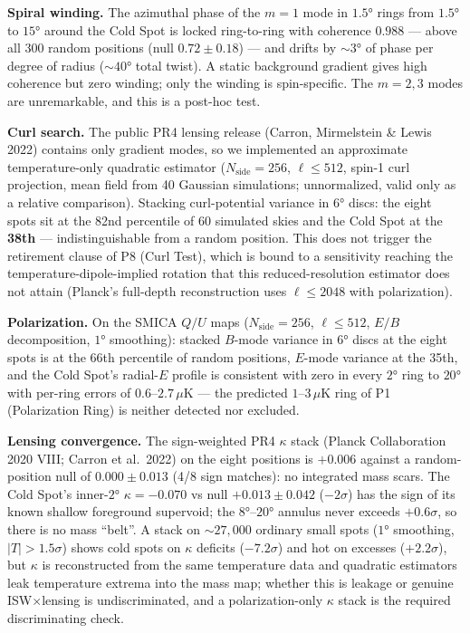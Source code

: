 \documentclass[
]{article}
\begin{document}
\textbf{Spiral winding.} The azimuthal phase of the \(m = 1\) mode in
\(1.5°\) rings from \(1.5°\) to \(15°\) around the Cold Spot is locked
ring-to-ring with coherence \(0.988\) --- above all 300 random positions
(null \(0.72 \pm 0.18\)) --- and drifts by \(\sim\!3°\) of phase per
degree of radius (\(\sim\!40°\) total twist). A static background
gradient gives high coherence but zero winding; only the winding is
spin-specific. The \(m = 2, 3\) modes are unremarkable, and this is a
post-hoc test.

\textbf{Curl search.} The public PR4 lensing release (Carron,
Mirmelstein \& Lewis 2022) contains only gradient modes, so we
implemented an approximate temperature-only quadratic estimator
(\(N_{\text{side}} = 256\), \(\ell \leq 512\), spin-1 curl projection,
mean field from 40 Gaussian simulations; unnormalized, valid only as a
relative comparison). Stacking curl-potential variance in \(6°\) discs:
the eight spots sit at the 82nd percentile of 60 simulated skies and the
Cold Spot at the \textbf{38th} --- indistinguishable from a random
position. This does not trigger the retirement clause of P8 (Curl Test),
which is bound to a sensitivity reaching the temperature-dipole-implied
rotation that this reduced-resolution estimator does not attain
(Planck's full-depth reconstruction uses \(\ell \leq 2048\) with
polarization).

\textbf{Polarization.} On the SMICA \(Q/U\) maps
(\(N_{\text{side}} = 256\), \(\ell \leq 512\), \(E/B\) decomposition,
\(1°\) smoothing): stacked \(B\)-mode variance in \(6°\) discs at the
eight spots is at the 66th percentile of random positions, \(E\)-mode
variance at the 35th, and the Cold Spot's radial-\(E\) profile is
consistent with zero in every \(2°\) ring to \(20°\) with per-ring
errors of \(0.6\)--\(2.7\,\mu\)K --- the predicted \(1\)--\(3\,\mu\)K
ring of P1 (Polarization Ring) is neither detected nor excluded.

\textbf{Lensing convergence.} The sign-weighted PR4 \(\kappa\) stack
(Planck Collaboration 2020 VIII; Carron et al.~2022) on the eight
positions is \(+0.006\) against a random-position null of
\(0.000 \pm 0.013\) (4/8 sign matches): no integrated mass scars. The
Cold Spot's inner-\(2°\) \(\kappa = -0.070\) vs null
\(+0.013 \pm 0.042\) (\(-2\sigma\)) has the sign of its known shallow
foreground supervoid; the \(8°\)--\(20°\) annulus never exceeds
\(+0.6\sigma\), so there is no mass ``belt''. A stack on
\(\sim\!27{,}000\) ordinary small spots (\(1°\) smoothing,
\(|T| > 1.5\sigma\)) shows cold spots on \(\kappa\) deficits
(\(-7.2\sigma\)) and hot on excesses (\(+2.2\sigma\)), but \(\kappa\) is
reconstructed from the same temperature data and quadratic estimators
leak temperature extrema into the mass map; whether this is leakage or
genuine ISW\(\times\)lensing is undiscriminated, and a polarization-only
\(\kappa\) stack is the required discriminating check.
\end{document}
